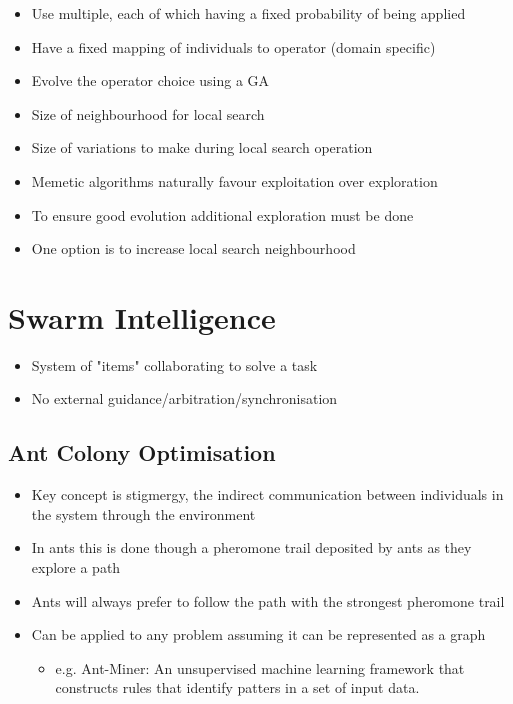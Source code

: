\documentclass[a4paper]{article}
\begin{document}

\begin{itemize}
  \item Use multiple, each of which having a fixed probability of being applied
  \item Have a fixed mapping of individuals to operator (domain specific)
  \item Evolve the operator choice using a GA
\end{itemize}


\begin{itemize}
  \item Size of neighbourhood for local search
  \item Size of variations to make during local search operation
\end{itemize}


\begin{itemize}
  \item Memetic algorithms naturally favour exploitation over exploration
  \item To ensure good evolution additional exploration must be done
  \item One option is to increase local search neighbourhood
\end{itemize}

\section{Swarm Intelligence}
\label{sec:swarm}

\begin{itemize}
  \item System of "items" collaborating to solve a task
  \item No external guidance/arbitration/synchronisation
\end{itemize}

\subsection{Ant Colony Optimisation}

\begin{itemize}
  \item Key concept is stigmergy, the indirect communication between individuals
        in the system through the environment
  \item In ants this is done though a pheromone trail deposited by ants as they
        explore a path
  \item Ants will always prefer to follow the path with the strongest pheromone
        trail
  \item Can be applied to any problem assuming it can be represented as a graph
    \begin{itemize}
      \item e.g. Ant-Miner: An unsupervised machine learning framework that
            constructs rules that identify patters in a set of input data.
    \end{itemize}
\end{itemize}
\end{document}
